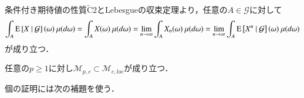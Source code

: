 	\begin{prf}
		条件付き期待値の性質$\tilde{\mathrm{C}}2$とLebesgueの収束定理より，任意の$A \in \mathcal{G}$に対して
		\begin{align}
			\int_A \operatorname{E} \left[ X \ \middle|\ \mathcal{G} \right](\omega)\ \mu(d\omega)
			= \int_A X(\omega)\ \mu(d\omega) = \lim_{n \to \infty} \int_A X_n(\omega)\ \mu(d\omega)
			= \lim_{n \to \infty} \int_A \operatorname{E} \left[ X^n \ \middle|\ \mathcal{G} \right](\omega)\ \mu(d\omega)
		\end{align}
		が成り立つ．
		\QED
	\end{prf}
	
	\begin{itembox}[l]{}
		\begin{prp}
			任意の$p \geq 1$に対し$\mathcal{M}_{p,c} \subset \mathcal{M}_{c,loc}$が成り立つ．
			\label{prp:M_pc_M_cloc}
		\end{prp}
	\end{itembox}
	個の証明には次の補題を使う．
	
